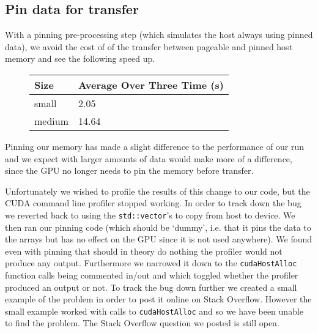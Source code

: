 \subsection{Pin data for transfer}
With a pinning pre-processing step (which simulates the host always using pinned data), we avoid the cost of of the transfer between pageable and pinned host memory and see the following speed up.
\begin{figure}[H]\centering \begin{tabular}{ l | l }
  \hline
  Size & Average Over Three Time (s) \\
  \hline
  \hline
  small & 2.05 \\
  medium & 14.64 \\
  \hline
\end{tabular} \end{figure}

Pinning our memory has made a slight difference to the performance of our run and we expect with larger amounts of data would make more of a difference, since the GPU no longer needs to pin the memory before transfer.

Unfortunately we wished to profile the results of this change to our code, but the CUDA command line profiler stopped working. In order to track down the bug we reverted back to using the \verb!std::vector!'s to copy from host to device. We then ran our pinning code (which should be `dummy', i.e. that it pins the data to the arrays but has no effect on the GPU since it is not used anywhere). We found even with pinning that should in theory do nothing the profiler would not produce any output. Furthermore we narrowed it down to the \verb!cudaHostAlloc! function calls being commented in/out and which toggled whether the profiler produced an output or not.
To track the bug down further we created a small example of the problem in order to post it online on Stack Overflow. However the small example worked with calls to \verb!cudaHostAlloc! and so we have been unable to find the problem. The Stack Overflow question we posted is still open.\cite{so_profiler}